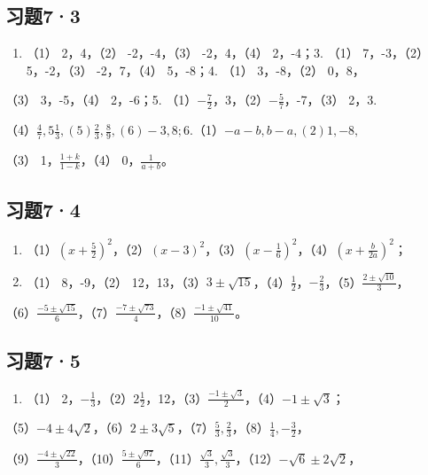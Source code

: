 \subsection{习题7·3}

\begin{enumerate}[start=2]
\item
  （1） 2，4，（2） -2，-4，（3） -2，4，（4） 2，-4；3. （1）
  7，-3，（2） 5，-2，（3） -2，7，（4） 5，-8；4. （1） 3，-8，（2）
  0，8，
\end{enumerate}

（3） 3，-5，（4） 2，-6；5.
（1）\(-\frac{7}{2}\)，3，（2）\(-\frac{5}{7}\)，-7，（3） 2，3.

（4）\(\frac{4}{7}, 5\frac{1}{3}, (5)\frac{2}{3}, \frac{8}{9}, (6) -3, 8; 6.\)（1）\(-a - b, b - a, (2) 1, -8,\)

（3） 1，\(\frac{1 + k}{1 - k}\)，（4） 0，\(\frac{1}{a + b}\)。

\subsection{习题7·4}

\begin{enumerate}
\item
  （1）\(\left(x + \frac{5}{2}\right)^2\)，（2）\((x - 3)^2\)，（3）\(\left(x - \frac{1}{6}\right)^2\)，（4）\(\left(x + \frac{b}{2a}\right)^2\)；
\item
  （1） 8，-9，（2）
  12，13，（3）\(3 \pm \sqrt{15}\)，（4）\(\frac{1}{2}\)，\(-\frac{2}{3}\)，（5）\(\frac{2 \pm \sqrt{10}}{3}\)，
\end{enumerate}

（6）\(\frac{-5 \pm \sqrt{15}}{6}\)，（7）\(\frac{-7 \pm \sqrt{73}}{4}\)，（8）\(\frac{-1 \pm \sqrt{41}}{10}\)。

\subsection{习题7·5}

\begin{enumerate}
\item
  （1）
  2，\(-\frac{1}{3}\)，（2）\(2\frac{1}{2}\)，12，（3）\(\frac{-1 \pm \sqrt{3}}{2}\)，（4）\(-1 \pm \sqrt{3}\)；
\end{enumerate}

（5）\(-4 \pm 4\sqrt{2}\)，（6）\(2 \pm 3\sqrt{5}\)，（7）\(\frac{5}{3}, \frac{2}{3}\)，（8）\(\frac{1}{4}, -\frac{3}{2}\)，

（9）\(\frac{-4\pm\sqrt{22}}{3}\)，（10）\(\frac{5\pm\sqrt{97}}{6}\)，（11）\(\frac{\sqrt{3}}{3}, \frac{\sqrt{3}}{3}\)，（12）\(-\sqrt{6}\pm 2\sqrt{2}\)，

